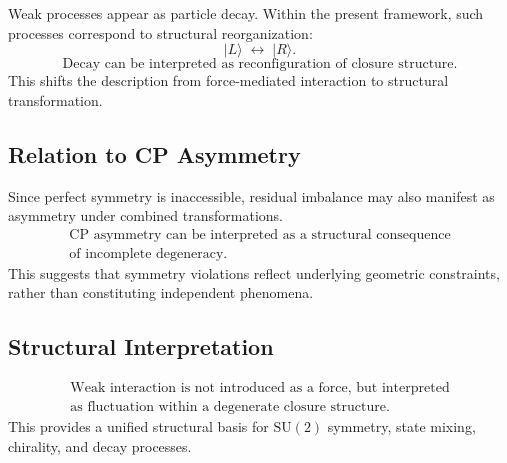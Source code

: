 Weak processes appear as particle decay.
Within the present framework,
such processes correspond to structural reorganization:
\begin{equation}
  |L\rangle \;\leftrightarrow\; |R\rangle.
\end{equation}
\begin{equation}
  \boxed{
    \text{Decay can be interpreted as reconfiguration of closure structure.}
  }
\end{equation}
This shifts the description from force-mediated interaction
to structural transformation.

\subsection{Relation to CP Asymmetry}

Since perfect symmetry is inaccessible,
residual imbalance may also manifest as asymmetry
under combined transformations.
\begin{equation}
  \boxed{\begin{gathered}
    \text{CP asymmetry can be interpreted as a structural consequence} \\
    \text{of incomplete degeneracy.}
  \end{gathered}}
\end{equation}
This suggests that symmetry violations reflect underlying geometric constraints,
rather than constituting independent phenomena.

\subsection{Structural Interpretation}

\begin{equation}
  \boxed{\begin{gathered}
    \text{Weak interaction is not introduced as a force, but interpreted} \\
    \text{as fluctuation within a degenerate closure structure.}
  \end{gathered}}
\end{equation}
This provides a unified structural basis for $\mathrm{SU}(2)$ symmetry,
state mixing, chirality, and decay processes.
